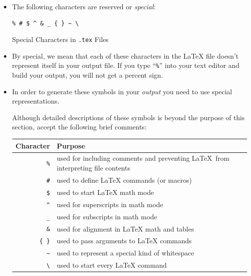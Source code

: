 \begin{itemize}

\item The following characters are reserved or \textit{special}:

  \begin{table}[h]
    \centering
    \begin{center}
      \begin{minipage}{.5\textwidth}
        \begin{framed}
\begin{verbatim}
% # $ ^ & _ { } ~ \
\end{verbatim}
        \end{framed}
      \end{minipage}
    \end{center}
    \caption{Special Characters in \texttt{.tex} Files} \label{tab:spec}
  \end{table}

\item By special, we mean that each of these characters in the \LaTeX{} file
  doesn't represent itself in your output file. If you type ``\texttt{\%}'' into
  your text editor and build your output, you will not get a percent sign.

\item In order to generate these symbols in your \textit{output} you need to use
  special representations.

  Although detailed descriptions of these symbols is beyond
  the purpose of this section, accept the following brief comments:\\

  \begin{table}[h]
    \centering
    \begin{framed}
      \begin{tabular}[h]{r p{3.5in}}
        \textbf{Character} & \textbf{Purpose} \\
        \hline
        \texttt{\%} & used for including comments and preventing \LaTeX ~from interpreting file contents \\
        \texttt{\#} & used to define \LaTeX{} commands (or macros) \\
        \texttt{\$} & used to start \LaTeX{} math mode \\
        \texttt{\textasciicircum{}} & used for superscripts in math mode \\
        \texttt{\_} & used for subscripts in math mode \\
        \texttt{\&} & used for alignment in \LaTeX{} math and tables \\
        \texttt{\{ \}} & used to pass arguments to \LaTeX{} commands \\
        \texttt{\~{}} & used to represent a special kind of whitespace \\
        \texttt{\textbackslash} & used to start every \LaTeX{} command \\
      \end{tabular}
    \end{framed}


\end{table}
\end{itemize}
